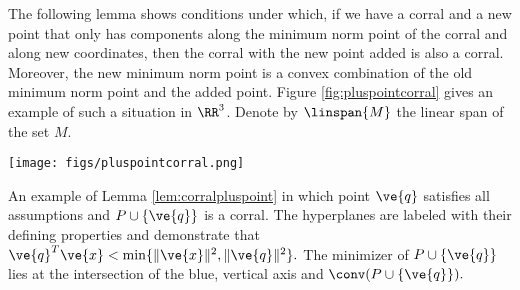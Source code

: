 The following lemma shows conditions under which, if we have a corral and a new point that only has components along the minimum norm point of the corral and along new coordinates, then the corral with the new point added is also a corral. Moreover, the new minimum norm point is a convex combination of the old minimum norm point and the added point. Figure \ref{fig:pluspointcorral} gives an example of such a situation in $\RR^3$. Denote by $\linspan{M}$ the linear span of the set $M$.

\begin{myfigure}
\centering
\texttt{[image: figs/pluspointcorral.png]}
\caption{An example of Lemma \ref{lem:corralpluspoint} in which point $\ve{q}$ satisfies all assumptions and $P \cup \{\ve{q}\}$ is a corral.  The hyperplanes are labeled with their defining properties and demonstrate that $\ve{q}^T\ve{x} < \min\{\|\ve{x}\|^2,\|\ve{q}\|^2\}.$ The minimizer of $P \cup \{\ve{q}\}$ lies at the intersection of the blue, vertical axis and $\conv(P \cup \{\ve{q}\}).$}
\label{fig:pluspointcorral}
\end{myfigure}

